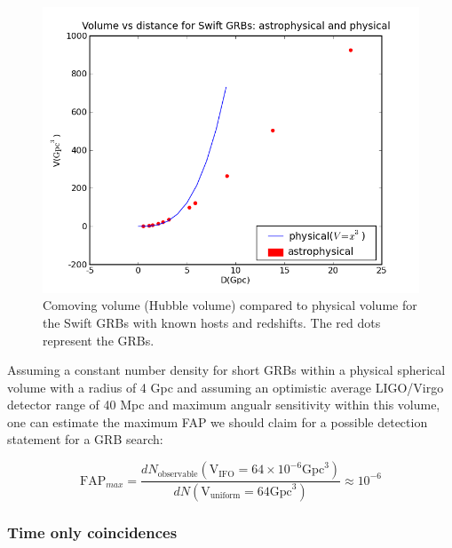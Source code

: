 \documentclass[epsf]{article}
\begin{document}
\begin{figure}[ht!]
\begin{minipage}[b]{1.0\linewidth}
\centering
\includegraphics[scale=0.50]{GRBvolume.png}
\caption{Comoving volume (Hubble volume) compared to physical volume for the Swift GRBs with known hosts and redshifts. The red dots represent the GRBs.}
\label{fig:figure1}
\end{minipage}
\end{figure}

Assuming a constant number density for short GRBs within a physical spherical volume with a radius of 4 Gpc and assuming an optimistic average LIGO/Virgo detector range of 40 Mpc and maximum angualr sensitivity within this volume, one can estimate the maximum FAP we should claim for a possible detection statement for a GRB search:

\begin{equation}
\mathrm{FAP}_{max} = \frac{dN_\mathrm{observable}(\mathrm{V_{IFO}}=64 \times 10^{-6} \mathrm{Gpc}^3)}{dN(\mathrm{V_{uniform}}= 64 \mathrm{Gpc}^3)} \approx 10^{-6}
\end{equation}
 

\subsubsection{Time only coincidences}
\end{document}
